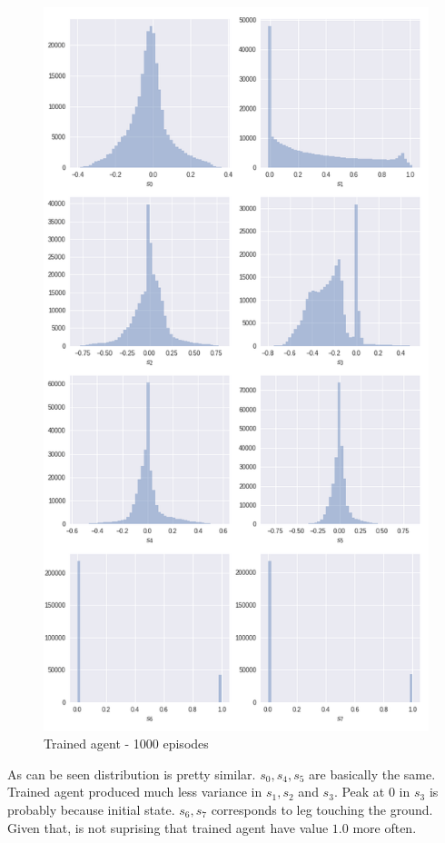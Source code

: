 \documentclass[12pt]{article}
\begin{document}
\begin{figure}[H]
\centering
\includegraphics[scale=0.5]{trained.png} 
\caption{Trained agent - 1000 episodes}
\end{figure}

As can be seen distribution is pretty similar. $s_0, s_4, s_5$ are basically the same. Trained agent produced much less variance in $s_1, s_2$ and $s_3$. Peak at $0$ in $s_3$ is probably because initial state. $s_6, s_7$ corresponds to leg touching the ground. Given that, is not suprising that trained agent have value $1.0$ more often.
\end{document}
